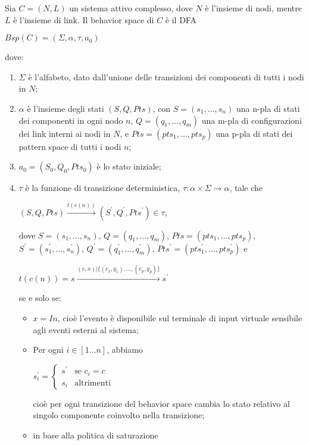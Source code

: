 \begin{defn}
Sia $C = (N,L)$ un sistema attivo complesso, dove $N$ è l'insieme di nodi, mentre $L$ è l'insieme di link. Il behavior space di $C$ è il DFA
\begin{center}
	$Bsp(C) = (\Sigma,\alpha,\tau,a_0)$
\end{center}
dove:
\begin{enumerate}
\item $\Sigma$ è l'alfabeto, dato dall'unione delle transizioni dei componenti di tutti i nodi in $N$;
\item $\alpha$  è l'insieme degli stati $(S,Q,Pts)$, con $S = (s_1,\ldots,s_n)$ una n-pla di stati dei componenti in ogni nodo $n$, $Q = (q_1, \ldots,q_m)$ una m-pla di configurazioni dei link interni ai nodi in $N$, e $Pts = (pts_1, \ldots, pts_p)$ una p-pla di stati dei pattern space di tutti i nodi $n$;
\item $a_0 = (S_0,Q_0,Pts_0)$ è lo stato iniziale;
\item $\tau$ è la funzione di transizione deterministica, $\tau: \alpha \times \Sigma \rightarrow \alpha$, tale che 
\begin{center}
$(S,Q,Pts) \xrightarrow{t(c(n))} (S^\prime, Q^\prime, Pts^\prime) \in \tau$,
\end{center}
dove $S = (s_1, \ldots,s_n)$, $Q = (q_1, \ldots,q_m)$, $Pts = (pts_1, \ldots, pts_p)$, $S^\prime = (s^\prime_1, \ldots,s^\prime_n)$, $Q^\prime = (q^\prime_1, \ldots,q^\prime_m)$, $Pts^\prime = (pts_1^\prime, \ldots, pts_p^\prime)$ e
\begin{center}
$t(c(n)) = s \xrightarrow{(e,x) | \{(e_1,y_1), \ldots, (e_p,y_p)\}} s^\prime$
\end{center}
se e solo se:
\begin{itemize}
\item $x = In$, cioè l'evento è disponibile sul terminale di input virtuale sensibile agli eventi esterni al sistema;
\item Per ogni $i \in [1 \ldots n]$, abbiamo
\begin{center}
$s^\prime_i = \begin{cases} s^\prime & \mbox{se }c_i = c\\ s_i & \mbox{altrimenti} \end{cases}$
\end{center}
cioè per ogni transizione del behavior space cambia lo stato relativo al singolo componente coinvolto nella transizione;
\item in base alla politica di saturazione
\end{itemize}
\end{enumerate}
\end{defn}

